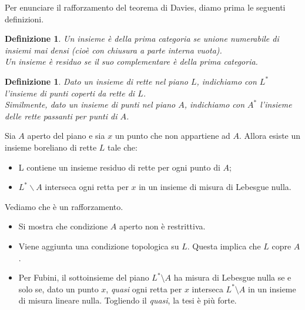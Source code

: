 \documentclass[11pt]{beamer} %
\newcommand{\<}{\langle}
\renewcommand{\>}{\rangle}
\theoremstyle{theorem}
\theoremstyle{theorem}
\theoremstyle{theorem}
\theoremstyle{theorem}
\newtheorem{defin}[teo]{Definizione}
\theoremstyle{theorem}
\begin{document}
\begin{frame}[fragile]
	Per enunciare il rafforzamento del teorema di Davies, diamo prima le seguenti definizioni.\\
	\pause	
	\begin{defin}
	Un insieme è della \emph{prima categoria} se unione numerabile di insiemi mai densi (cioè con chiusura a parte interna vuota).\\ \pause
	Un insieme è \emph{residuo} se il suo complementare è della prima categoria. 
	\end{defin}
	\pause
	\begin{defin}
	Dato un insieme di rette nel piano $L$, indichiamo con $L^*$ l'insieme di punti coperti da rette di $L$.\\
	\pause
	Similmente, dato un insieme di punti nel piano $A$, indichiamo con $A^*$ l'insieme delle rette passanti per punti di $A$.
	\end{defin}

\end{frame}

\begin{frame}[fragile]

\begin{lemma}[1]
	Sia $A$ aperto del piano e sia $x$ un punto che non appartiene ad $A$. Allora esiste un insieme boreliano di rette $L$ tale che:\\
	\begin{itemize}
		\item L contiene un insieme residuo di rette per ogni punto di $A$;\\
		\item $L^{*} \backslash A$ interseca ogni retta per $x$ in un insieme di misura di Lebesgue nulla.\\
	\end{itemize}
\end{lemma}
	\pause
	Vediamo che è un rafforzamento.\\
	\pause
	\begin{itemize}
		\item Si mostra che condizione $A$ aperto non è restrittiva.\\
		\pause
		\item Viene aggiunta una condizione topologica su $L$. Questa implica che $L$ copre $A$.\\
		\pause
		\item Per Fubini, il sottoinsieme del piano $L^* \setminus A$ ha misura di Lebesgue nulla se e solo se, dato un punto $x$, \emph{quasi} ogni retta per $x$ interseca $L^* \setminus A$ in un insieme di misura lineare nulla. Togliendo il \emph{quasi}, la tesi è più forte.\\
	\end{itemize}

\end{frame}
\end{document}
